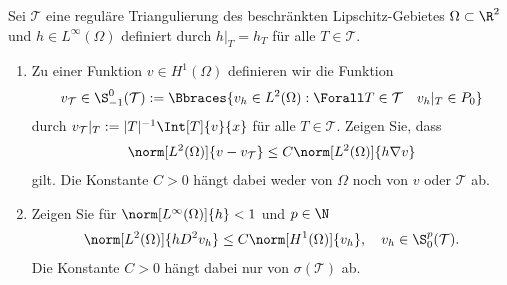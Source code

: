
\begin{exercise}

Sei $\mathcal{T}$ eine reguläre Triangulierung des beschränkten Lipschitz-Gebietes $\Omega \subset \R^2$ und $h \in L^\infty(\Omega)$ definiert durch $h|_T = h_T$ für alle $T \in \mathcal{T}$.
\begin{enumerate}[label = \textbf{\alph*)}]
  \item Zu einer Funktion $v \in H^1(\Omega)$ definieren wir die Funktion
  \begin{align*}
    v_\mathcal{T} \in \S_{-1}^0(\mathcal{T})
    :=
    \Bbraces
    {
      v_h \in L^2(\Omega):
      \Forall T \in \mathcal{T}
      \quad
      v_h|_T \in P_0
    }
  \end{align*}
  durch $v_\mathcal{T}|_T := |T|^{-1} \Int[T]{v}{x}$ für alle $T \in \mathcal{T}$.
  Zeigen Sie, dass
  \begin{align*}
    \norm[L^2(\Omega)]{v - v_\mathcal{T}}
    \leq
    C \norm[L^2(\Omega)]{h \nabla v}
  \end{align*}
  gilt. Die Konstante $C > 0$ hängt dabei weder von $\Omega$ noch von $v$ oder $\mathcal{T}$ ab.
  \item Zeigen Sie für $\norm[L^\infty(\Omega)]{h} < 1$ und $p \in \N$
  \begin{align}
    \norm[L^2(\Omega)]{h D^2 v_h}
    \leq
    C \norm[H^1(\Omega)]{v_h},
    \quad
    v_h \in \S_0^p(\mathcal{T}).
  \end{align}
  Die Konstante $C > 0$ hängt dabei nur von $\sigma(\mathcal{T})$ ab.
\end{enumerate}

\end{exercise}


